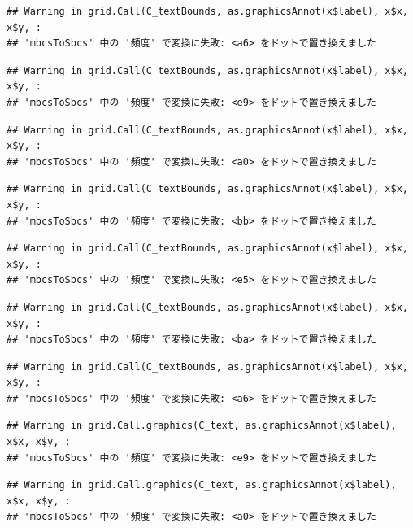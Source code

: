 \documentclass[
]{book}
\begin{document}
\begin{verbatim}
## Warning in grid.Call(C_textBounds, as.graphicsAnnot(x$label), x$x, x$y, :
## 'mbcsToSbcs' 中の '頻度' で変換に失敗: <a6> をドットで置き換えました
\end{verbatim}

\begin{verbatim}
## Warning in grid.Call(C_textBounds, as.graphicsAnnot(x$label), x$x, x$y, :
## 'mbcsToSbcs' 中の '頻度' で変換に失敗: <e9> をドットで置き換えました
\end{verbatim}

\begin{verbatim}
## Warning in grid.Call(C_textBounds, as.graphicsAnnot(x$label), x$x, x$y, :
## 'mbcsToSbcs' 中の '頻度' で変換に失敗: <a0> をドットで置き換えました
\end{verbatim}

\begin{verbatim}
## Warning in grid.Call(C_textBounds, as.graphicsAnnot(x$label), x$x, x$y, :
## 'mbcsToSbcs' 中の '頻度' で変換に失敗: <bb> をドットで置き換えました
\end{verbatim}

\begin{verbatim}
## Warning in grid.Call(C_textBounds, as.graphicsAnnot(x$label), x$x, x$y, :
## 'mbcsToSbcs' 中の '頻度' で変換に失敗: <e5> をドットで置き換えました
\end{verbatim}

\begin{verbatim}
## Warning in grid.Call(C_textBounds, as.graphicsAnnot(x$label), x$x, x$y, :
## 'mbcsToSbcs' 中の '頻度' で変換に失敗: <ba> をドットで置き換えました
\end{verbatim}

\begin{verbatim}
## Warning in grid.Call(C_textBounds, as.graphicsAnnot(x$label), x$x, x$y, :
## 'mbcsToSbcs' 中の '頻度' で変換に失敗: <a6> をドットで置き換えました
\end{verbatim}

\begin{verbatim}
## Warning in grid.Call.graphics(C_text, as.graphicsAnnot(x$label), x$x, x$y, :
## 'mbcsToSbcs' 中の '頻度' で変換に失敗: <e9> をドットで置き換えました
\end{verbatim}

\begin{verbatim}
## Warning in grid.Call.graphics(C_text, as.graphicsAnnot(x$label), x$x, x$y, :
## 'mbcsToSbcs' 中の '頻度' で変換に失敗: <a0> をドットで置き換えました
\end{verbatim}
\end{document}
